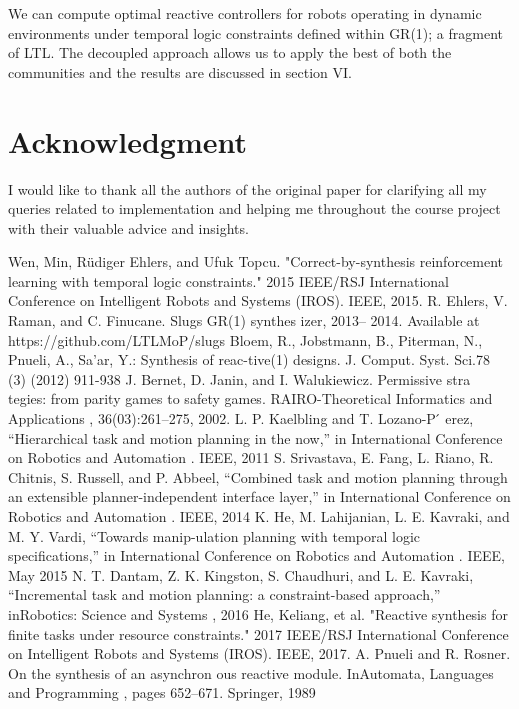 \documentclass[letterpaper, 10 pt, conference]{ieeeconf}  %
\begin{document}
We can compute optimal reactive controllers for robots operating in dynamic environments under temporal logic constraints defined within GR(1); a fragment of LTL. The decoupled approach allows us to apply the best of both the communities and the results are discussed in section VI.

\section{Acknowledgment}

I would like to thank all the authors of the original paper for clarifying all my queries related to implementation and helping me throughout the course project with their valuable advice and insights. 

\begin{thebibliography}{99}
Wen, Min, Rüdiger Ehlers, and Ufuk Topcu. "Correct-by-synthesis reinforcement learning with temporal logic constraints." 2015 IEEE/RSJ International Conference on Intelligent Robots and Systems (IROS). IEEE, 2015.
R. Ehlers, V. Raman, and C. Finucane. Slugs GR(1) synthes izer, 2013– 2014.  Available  at https://github.com/LTLMoP/slugs
 Bloem, R., Jobstmann, B., Piterman, N., Pnueli, A., Sa'ar, Y.:  Synthesis of reac-tive(1) designs.  J. Comput. Syst. Sci.78 (3) (2012) 911-938
  J.  Bernet,  D.  Janin,  and  I.  Walukiewicz.   Permissive  stra tegies:  from parity  games  to  safety  games. RAIRO-Theoretical  Informatics  and Applications ,  36(03):261–275,  2002.
L. P. Kaelbling and T. Lozano-P ́ erez, “Hierarchical task and motion planning in the now,” in International Conference on Robotics and Automation .  IEEE, 2011
S. Srivastava, E. Fang, L. Riano, R. Chitnis, S. Russell, and P. Abbeel, “Combined task and motion planning through an extensible planner-independent interface layer,” in International Conference on Robotics and Automation .  IEEE, 2014
K. He, M. Lahijanian, L. E. Kavraki, and M. Y. Vardi, “Towards manip-ulation planning with temporal logic specifications,” in International Conference on Robotics and Automation .  IEEE, May 2015
N. T. Dantam, Z. K. Kingston, S. Chaudhuri, and L. E. Kavraki, “Incremental task and motion planning: a constraint-based approach,” inRobotics: Science and Systems , 2016
He, Keliang, et al. "Reactive synthesis for finite tasks under resource constraints." 2017 IEEE/RSJ International Conference on Intelligent Robots and Systems (IROS). IEEE, 2017.
A. Pnueli and R. Rosner. On the synthesis of an asynchron ous reactive module.  InAutomata, Languages  and Programming , pages 652–671. Springer,  1989

\end{thebibliography}
\end{document}
